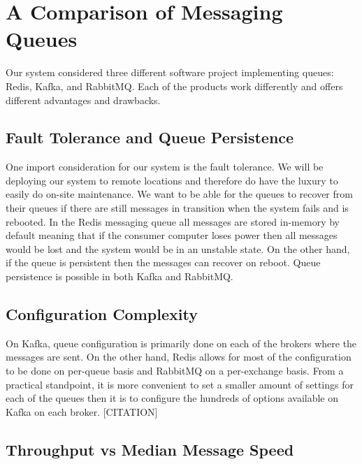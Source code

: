 \documentclass[12pt]{report}
\begin{document}
\newpage\thispagestyle{fancy}\sectionfont{\scshape}
\section*{A Comparison of Messaging Queues}
\par\indent
Our system considered three different software project implementing queues: Redis, Kafka, and RabbitMQ. Each of the products work differently and offers different advantages and drawbacks.

\subsection*{Fault Tolerance and Queue Persistence}

One import consideration for our system is the fault tolerance. We will be deploying our system to remote locations and therefore do have the luxury to easily do on-site maintenance. We want to be able for the queues to recover from their queues if there are still messages in transition when the system fails and is rebooted. In the Redis messaging queue all messages are stored in-memory by default meaning that if the consumer computer loses power then all messages would be lost and the system would be in an unstable state. On the other hand, if the queue is persistent then the messages can recover on reboot. Queue persistence is possible in both Kafka and RabbitMQ.

\subsection*{Configuration Complexity}

On Kafka, queue configuration is primarily done on each of the brokers where the messages are sent. On the other hand, Redis allows for most of the configuration to be done on per-queue basis and RabbitMQ on a per-exchange basis. From a practical standpoint, it is more convenient to set a smaller amount of settings for each of the queues then it is to configure the hundreds of options available on Kafka on each broker. [CITATION]

\subsection*{Throughput vs Median Message Speed}
\end{document}
